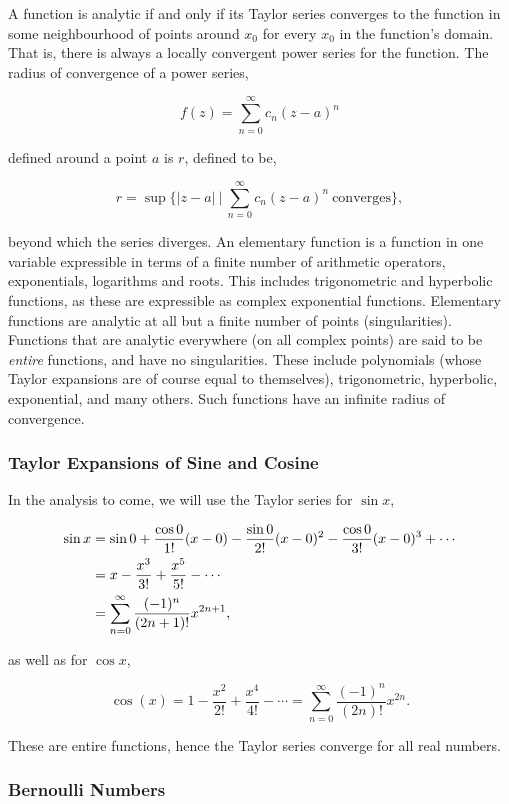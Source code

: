 \documentclass[11pt]{amsart}
\begin{document}
A function is analytic if and only if its Taylor series converges to the function in some neighbourhood of points around $x_0$ for every $x_0$ in the function's domain. That is, there is always a locally convergent power series for the function. The radius of convergence of a power series,

$$f(z) = \sum_{n=0}^{\infty}c_n(z - a)^n$$

defined around a point $a$ is $r$, defined to be,

$$r = \sup\Bigg\{|z - a| \ \Bigg| \ \sum_{n=0}^{\infty}c_n(z - a)^n \ \text{converges} \Bigg\},$$

beyond which the series diverges. An elementary function is a function in one variable expressible in terms of a finite number of arithmetic operators, exponentials, logarithms and roots. This includes trigonometric and hyperbolic functions, as these are expressible as complex exponential functions. Elementary functions are analytic at all but a finite number of points (singularities). Functions that are analytic everywhere (on all complex points) are said to be \emph{entire} functions, and have no singularities. These include polynomials (whose Taylor expansions are of course equal to themselves), trigonometric, hyperbolic, exponential, and many others. Such functions have an infinite radius of convergence.

\subsubsection{Taylor Expansions of Sine and Cosine}

In the analysis to come, we will use the Taylor series for $\sin x$,

\begin{align}
\sin x &= \sin 0 + \frac{\cos 0}{1!}(x - 0) - \frac{\sin 0}{2!}(x - 0)^2 - \frac{\cos 0}{3!}(x - 0)^3 + \cdots \notag \\
&= x - \frac{x^3}{3!} + \frac{x^5}{5!} - \cdots \notag \\
&= \sum_{n=0}^{\infty}\frac{(-1)^n}{(2n + 1)!}x^{2n+1}, \notag
\end{align}

as well as for $\cos x$,

$$
\cos(x) = 1 - \frac{x^2}{2!} + \frac{x^4}{4!} - \cdots = \sum_{n=0}^{\infty}\frac{(-1)^n}{(2n)!}x^{2n}.
$$

These are entire functions, hence the Taylor series converge for all real numbers.

\subsubsection{Bernoulli Numbers}
\end{document}
